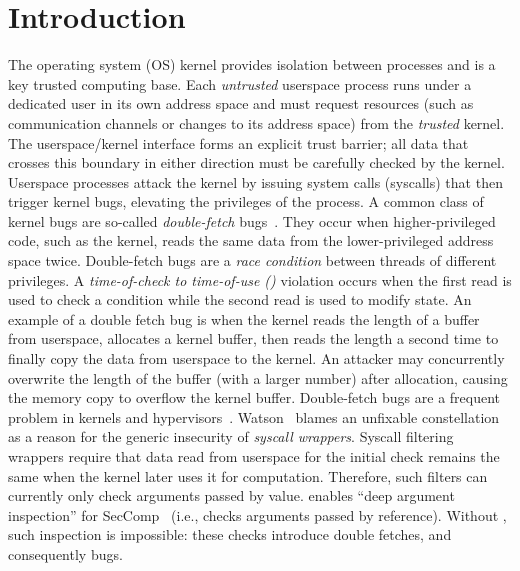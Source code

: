 \section{Introduction}

The operating system (OS) kernel provides isolation between processes and is
a key trusted computing
base. Each \emph{untrusted} userspace process runs under a
dedicated user in its own address space and must request resources (such as
communication channels or changes to its address space) from the \emph{trusted}
kernel. The userspace/kernel interface forms an explicit trust barrier;
all data that crosses this boundary in either direction must be carefully
checked by the kernel.
%
Userspace processes attack the kernel by issuing system calls (syscalls) that then trigger
kernel bugs, elevating the privileges of the process.
%
A common class of kernel bugs are so-called \emph{double-fetch}
bugs~\cite{serna08doublefetch, twizsgrakky07ring0, wilhelm2016xenpwn,
wang2018survey}. They occur when higher-privileged code, such as
the kernel, reads the same data from the lower-privileged address space twice.
%
Double-fetch bugs are a
\emph{race condition} between threads of different privileges. A
\emph{time-of-check to time-of-use (\tocttou)} violation occurs when the first
read is used to check a condition while the second read is used to modify
state.
%
An example of a double fetch bug is when the kernel reads the length of a buffer
from userspace, allocates a kernel buffer, then reads the length a second time
to finally copy the data from userspace to the kernel. An attacker may concurrently
overwrite the length of the buffer (with a larger number) after allocation,
causing the memory copy to overflow the kernel buffer.
%
Double-fetch bugs are a frequent problem in kernels and
hypervisors~\cite{cve201812633, cve202012652, cve20131332, cve201920610,
cve20158550, cve201610439, cve201610435, cve201610433, cve20195519,
cve20168438}.
Watson~\cite{watson2007exploiting} blames an unfixable \tocttou
constellation as a reason for the generic insecurity of \emph{syscall
wrappers}.
Syscall filtering wrappers require that data read from userspace for the
initial check remains the same when the kernel later uses it for computation.
Therefore, such filters can currently only check arguments passed by value.
\midas enables ``deep argument inspection'' for SecComp~\cite{seccomp_deep, seccomp}
(i.e., checks arguments passed by reference).
Without \midas, such inspection is impossible: these checks
introduce double fetches, and consequently \tocttou bugs.

